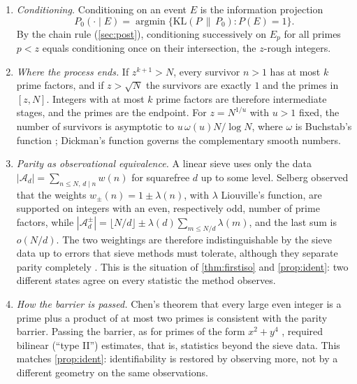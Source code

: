 \documentclass[11pt]{article}
\theoremstyle{definition}
\theoremstyle{remark}
\begin{document}
\begin{enumerate}[label=(\alph*),leftmargin=*]
\item \emph{Conditioning.} Conditioning on an event $E$ is the information projection
  \cite{Csiszar1975}
  \[
  P_0(\cdot\mid E)=\operatorname{argmin}\{\mathrm{KL}(P\,\|\,P_0):P(E)=1\}.
  \]
  By the
  chain rule (\cref{sec:post}), conditioning successively on $E_p$ for all primes $p<z$ equals
  conditioning once on their intersection, the $z$-rough integers.
\item \emph{Where the process ends.} If $z^{k+1}>N$, every survivor $n>1$ has at most $k$ prime
  factors, and if $z>\sqrt N$ the survivors are exactly $1$ and the primes in $[z,N]$. Integers with at
  most $k$ prime factors are therefore intermediate stages, and the primes are the endpoint. For
  $z=N^{1/u}$ with $u>1$ fixed, the number of survivors is asymptotic to $u\,\omega(u)N/\log N$, where
  $\omega$ is Buchstab's function \cite[III.6]{Tenenbaum2015}; Dickman's function governs the
  complementary smooth numbers.
\item \emph{Parity as observational equivalence.} A linear sieve uses only the data
  $|\mathcal{A}_d|=\sum_{n\le N,\,d\mid n}w(n)$ for squarefree $d$ up to some level. Selberg observed
  that the weights $w_\pm(n)=1\pm\lambda(n)$, with $\lambda$ Liouville's function, are supported on
  integers with an even, respectively odd, number of prime factors, while
  $|\mathcal{A}^\pm_d|=\lfloor N/d\rfloor\pm\lambda(d)\sum_{m\le N/d}\lambda(m)$, and the last sum is
  $o(N/d)$. The two weightings are therefore indistinguishable by the sieve data up to errors that
  sieve methods must tolerate, although they separate parity completely
  \cite[Ch.~16]{FriedlanderIwaniec2010}. This is the situation of \cref{thm:firstiso} and
  \cref{prop:ident}: two different states agree on every statistic the method observes.
\item \emph{How the barrier is passed.} Chen's theorem that every large even integer is a prime plus
  a product of at most two primes \cite{Chen1973} is consistent with the parity barrier. Passing the
  barrier, as for primes of the form $x^2+y^4$ \cite{FriedlanderIwaniec1998}, required bilinear
  (``type II'') estimates, that is, statistics beyond the sieve data. This matches
  \cref{prop:ident}: identifiability is restored by observing more, not by a different geometry on the
  same observations.
\end{enumerate}

\end{document}
